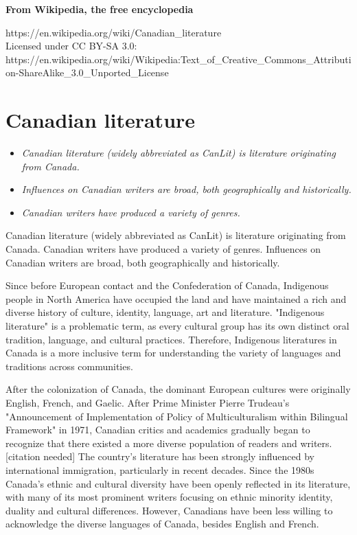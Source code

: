 \textbf{From Wikipedia, the free encyclopedia}

https://en.wikipedia.org/wiki/Canadian\_literature\\
Licensed under CC BY-SA 3.0:\\
https://en.wikipedia.org/wiki/Wikipedia:Text\_of\_Creative\_Commons\_Attribution-ShareAlike\_3.0\_Unported\_License

\section{Canadian literature}\label{canadian-literature}

\begin{itemize}
\item
  \emph{Canadian literature (widely abbreviated as CanLit) is literature
  originating from Canada.}
\item
  \emph{Influences on Canadian writers are broad, both geographically
  and historically.}
\item
  \emph{Canadian writers have produced a variety of genres.}
\end{itemize}

Canadian literature (widely abbreviated as CanLit) is literature
originating from Canada. Canadian writers have produced a variety of
genres. Influences on Canadian writers are broad, both geographically
and historically.

Since before European contact and the Confederation of Canada,
Indigenous people in North America have occupied the land and have
maintained a rich and diverse history of culture, identity, language,
art and literature. "Indigenous literature" is a problematic term, as
every cultural group has its own distinct oral tradition, language, and
cultural practices. Therefore, Indigenous literatures in Canada is a
more inclusive term for understanding the variety of languages and
traditions across communities.

After the colonization of Canada, the dominant European cultures were
originally English, French, and Gaelic. After Prime Minister Pierre
Trudeau's "Announcement of Implementation of Policy of Multiculturalism
within Bilingual Framework" in 1971, Canadian critics and academics
gradually began to recognize that there existed a more diverse
population of readers and writers.{[}citation needed{]} The country's
literature has been strongly influenced by international immigration,
particularly in recent decades. Since the 1980s Canada's ethnic and
cultural diversity have been openly reflected in its literature, with
many of its most prominent writers focusing on ethnic minority identity,
duality and cultural differences. However, Canadians have been less
willing to acknowledge the diverse languages of Canada, besides English
and French.


